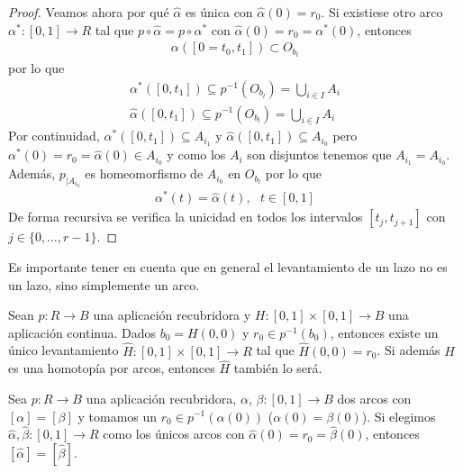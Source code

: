 \begin{lema}
\begin{proof}
       Veamos ahora por qué $\hat{\alpha}$ es única con $\hat{\alpha}(0)=r_0$. Si existiese otro arco $\alpha^*:[0,1]\to R$ tal que $p\circ \hat{\alpha} = p\circ \alpha^*$ con $\hat{\alpha}(0) = r_0 = \alpha^*(0)$, entonces 
       \begin{gather*}
            \alpha([0=t_0,t_1]) \subset O_{b_l}
       \end{gather*}
       por lo que 
       \begin{gather*}
            \alpha^*([0,t_1]) \subseteq p^{-1}(O_{b_l}) = \bigcup\limits_{i\in I} A_i\\
            \hat{\alpha}([0,t_1]) \subseteq p^{-1}(O_{b_l}) = \bigcup\limits_{i\in I} A_i
       \end{gather*}
       Por continuidad, $\alpha^*([0,t_1])\subseteq A_{i_1}$ y $\hat{\alpha}([0,t_1])\subseteq A_{i_0}$ pero $\alpha^*(0)=r_0=\hat{\alpha}(0)\in A_{i_0}$ y como los $A_i$ son disjuntos tenemos que $A_{i_1} = A_{i_0}$. Además, $p_{|A_{i_0}}$ es homeomorfismo de $A_{i_0}$ en $O_{b_l}$ por lo que 
       \begin{gather*}
            \alpha^*(t) = \hat{\alpha}(t),\ \ \ t\in [0,1]
       \end{gather*}
       De forma recursiva se verifica la unicidad en todos los intervalos $[t_j, t_{j+1}]$ con $j\in \{0,\dots,r-1\}$.
    \end{proof}
\end{lema}

\begin{observacion}
    Es importante tener en cuenta que en general el levantamiento de un lazo no es un lazo, sino simplemente un arco.\\
\end{observacion}

\begin{lema}
    Sean $p:R \to B$ una aplicación recubridora y $H:[0,1]\times[0,1]\to B$ una aplicación continua. Dados $b_0=H(0,0)$ y $r_0\in p^{-1}(b_0)$, entonces existe un único levantamiento $\hat{H}:[0,1]\times[0,1]\to R$ tal que $\hat{H}(0,0) = r_0$. Si además $H$ es una homotopía por arcos, entonces $\hat{H}$ también lo será.
\end{lema}

\begin{coro}
    Sea $p:R\to B$ una aplicación recubridora, $\alpha$, $\beta:[0,1]\to B$ dos arcos con $[\alpha]=[\beta]$ y tomamos un $r_0\in p^{-1}(\alpha(0))$ ($\alpha(0)=\beta(0)$). Si elegimos $\hat{\alpha}, \hat{\beta}:[0,1]\to R$ como los únicos arcos con $\hat{\alpha}(0)=r_0=\hat{\beta}(0)$, entonces $[\hat{\alpha}] = [\hat{\beta}]$.
\end{coro}

